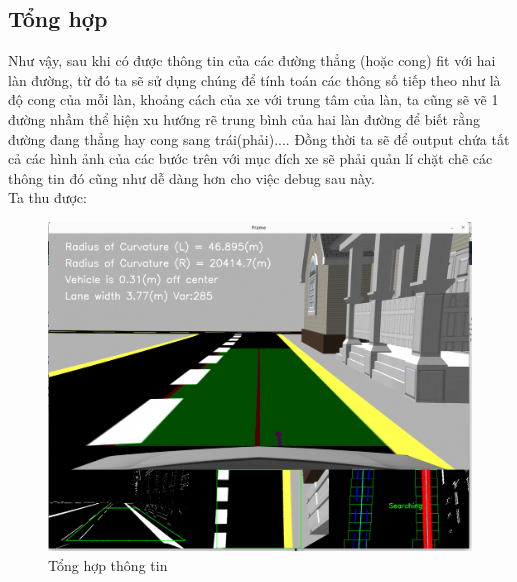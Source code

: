 \subsection{Tổng hợp}
Như vậy, sau khi có được thông tin của các đường thẳng (hoặc cong) fit với hai làn đường, từ đó ta sẽ sử dụng chúng để tính toán các thông số tiếp theo như là độ cong của mỗi làn, khoảng cách của xe với trung tâm của làn, ta cũng sẽ vẽ 1 đường nhầm thể hiện xu hướng rẽ trung bình của hai làn đường để biết rằng đường đang thẳng hay cong sang trái(phải).... Đồng thời ta sẽ để output chứa tất cả các hình ảnh của các bước trên với mục đích xe sẽ phải quản lí chặt chẽ các thông tin đó cũng như dễ dàng hơn cho việc debug sau này.\\
Ta thu được:
\begin{figure}[htbp]
    \centering
    \includegraphics[width=0.8\linewidth]{images/3-lane/combine.png}
    \caption{Tổng hợp thông tin}
\end{figure}